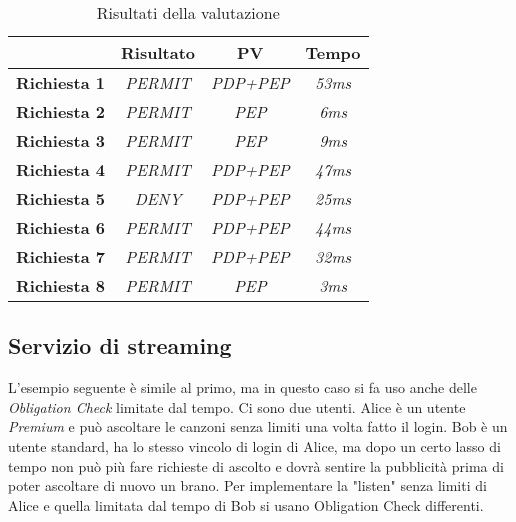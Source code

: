 \begin{table}[h]
\centering
\footnotesize
\caption{Risultati della valutazione}
\label{tab:risultati_1}
\begin{tabular}{cccc}
\multicolumn{1}{l}{} & \textbf{Risultato} & \textbf{PV} & \textbf{Tempo} \\ \hline
\textbf{Richiesta 1} & \textit{PERMIT} & \textit{PDP+PEP} & \textit{53ms} \\ \hline
\textbf{Richiesta 2} & \textit{PERMIT} & \textit{PEP} & \textit{6ms} \\ \hline
\textbf{Richiesta 3} & \textit{PERMIT} & \textit{PEP} & \textit{9ms} \\ \hline
\textbf{Richiesta 4} & \textit{PERMIT} & \textit{PDP+PEP} & \textit{47ms} \\ \hline
\textbf{Richiesta 5} & \textit{DENY}   & \textit{PDP+PEP} & \textit{25ms} \\ \hline
\textbf{Richiesta 6} & \textit{PERMIT} & \textit{PDP+PEP} & \textit{44ms} \\ \hline
\textbf{Richiesta 7} & \textit{PERMIT} & \textit{PDP+PEP} & \textit{32ms} \\ \hline
\textbf{Richiesta 8} & \textit{PERMIT} & \textit{PEP} & \textit{3ms} \\ \hline
\end{tabular}
\end{table}
\subsection{Servizio di streaming}
\label{sub:Stream_Code_Sec}
L'esempio seguente è simile al primo, ma in questo caso si fa uso anche delle \emph{Obligation Check} limitate dal tempo.
Ci sono due utenti. Alice è un utente \emph{Premium} e può ascoltare le canzoni senza limiti una volta fatto il login. Bob
è un utente standard, ha lo stesso vincolo di login di Alice, ma dopo un certo lasso di tempo non può più fare richieste
di ascolto e dovrà sentire la pubblicità prima di poter ascoltare di nuovo un brano.
Per implementare la "listen" senza limiti di Alice e quella limitata dal tempo di Bob si usano Obligation Check differenti.

